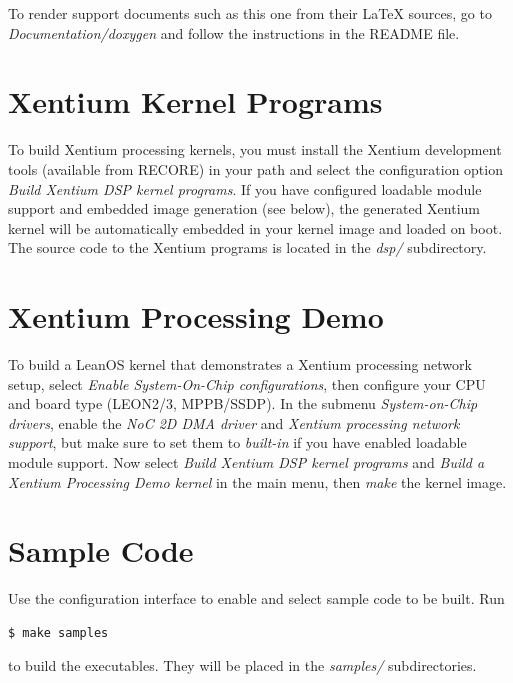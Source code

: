 \noindent
To render support documents such as this one from their LaTeX sources, go
to \emph{Documentation/doxygen} and follow the instructions in the README file.




\section {Xentium Kernel Programs}

To build \gls{Xentium} processing kernels, you must install the Xentium
development tools (available from RECORE) in your path and select the
configuration option \emph{Build Xentium DSP kernel programs}.  If you have
configured loadable module support and embedded image generation (see below),
the generated Xentium kernel will be automatically embedded in your kernel
image and loaded on boot. \\

\noindent
The source code to the Xentium programs is located in the \emph{dsp/}
subdirectory.


\section {Xentium Processing Demo}

To build a LeanOS kernel that demonstrates a Xentium processing network setup,
select \emph{Enable System-On-Chip configurations}, then configure your CPU and
board type (LEON2/3, MPPB/SSDP). In the submenu \emph{System-on-Chip
drivers}, enable the \emph{NoC 2D DMA driver} and \emph{Xentium processing
network support}, but make sure to set them to \emph{built-in} if you have
enabled loadable module support. Now select \emph{Build Xentium DSP kernel
programs} and \emph{Build a Xentium Processing Demo kernel} in the main menu,
then \emph{make} the kernel image.

\section {Sample Code}

Use the configuration interface to enable and select sample code to be built.
Run

\begin{lstlisting}[language=bash]
  $ make samples
\end{lstlisting}

\noindent
to build the executables. They will be placed in the \emph{samples/}
subdirectories.



